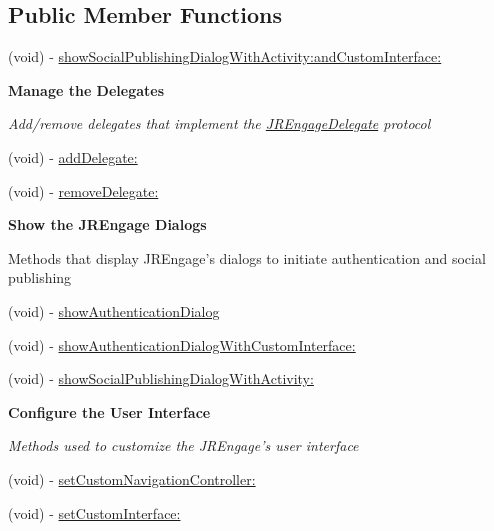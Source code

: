 \subsection*{Public Member Functions}
\begin{DoxyCompactItemize}
\item 
(void) -\/ \hyperlink{interface_j_r_engage_af5c2aa40f5c45a22f369900d1bd81953}{showSocialPublishingDialogWithActivity:andCustomInterface:}
\end{DoxyCompactItemize}
\begin{Indent}{\bf Manage the Delegates}\par
{\em \label{_amgrpf6bb425cb9b7388d33e37d551db6b02e}
 Add/remove delegates that implement the \hyperlink{protocol_j_r_engage_delegate-p}{JREngageDelegate} protocol }\begin{DoxyCompactItemize}
\item 
(void) -\/ \hyperlink{interface_j_r_engage_a18377ffb55f821587e6d38b3489692e8}{addDelegate:}
\item 
(void) -\/ \hyperlink{interface_j_r_engage_ab3f12ac148ea0f6df4d7ff7789cc7c94}{removeDelegate:}
\end{DoxyCompactItemize}
\end{Indent}
\begin{Indent}{\bf Show the JREngage Dialogs}\par
{\em \label{_amgrp345603279e1df04f4a3678e78089b7be}
 \label{interface_j_r_engage_showMethods}
\hypertarget{interface_j_r_engage_showMethods}{}


Methods that display JREngage's dialogs to initiate authentication and social publishing }\begin{DoxyCompactItemize}
\item 
(void) -\/ \hyperlink{interface_j_r_engage_a01ecdff491f91543e18f33d0e565b046}{showAuthenticationDialog}
\item 
(void) -\/ \hyperlink{interface_j_r_engage_ac8e1206be8608fbed548b7ec5f85e6e6}{showAuthenticationDialogWithCustomInterface:}
\item 
(void) -\/ \hyperlink{interface_j_r_engage_afca7b5ab9a57edc1a460aaec882207c4}{showSocialPublishingDialogWithActivity:}
\end{DoxyCompactItemize}
\end{Indent}
\begin{Indent}{\bf Configure the User Interface}\par
{\em \label{_amgrp94e7ef441fcaa606cadd8cfd8b428e50}
 Methods used to customize the JREngage's user interface }\begin{DoxyCompactItemize}
\item 
(void) -\/ \hyperlink{interface_j_r_engage_a6c704bbff377d20603e6b52bd0ae17f1}{setCustomNavigationController:}
\item 
(void) -\/ \hyperlink{interface_j_r_engage_ab1757bbe9e83255b1b9128c630267fdf}{setCustomInterface:}
\end{DoxyCompactItemize}
\end{Indent}
